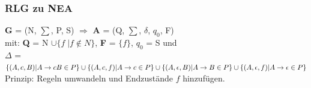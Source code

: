\documentclass[12pt,a4paper]{article}
\begin{document}
	\subsubsection{RLG zu NEA}
	\textbf{G} = (N, $\sum$, P, S) $\Rightarrow$ \textbf{A} = (Q, $\sum$, $\delta$, $q_0$, F)  \\
	mit: \textbf{Q} = N $\cup\{f \; | f \notin N\}$, \textbf{F} = $\{f\}$, $q_0$ = S und\\
	$\Delta$ = $\{ (A, c, B) | A \rightarrow cB \in P\} \cup \\
	\{ (A, c, f) | A \rightarrow c \in P\} \cup \\
	\{ (A, \epsilon, B) | A \rightarrow B \in P\} \cup \\ 
	\{ (A, \epsilon, f) | A \rightarrow \epsilon \in P\}$\\
	Prinzip: Regeln umwandeln und Endzustände $f$ hinzufügen.
\end{document}
